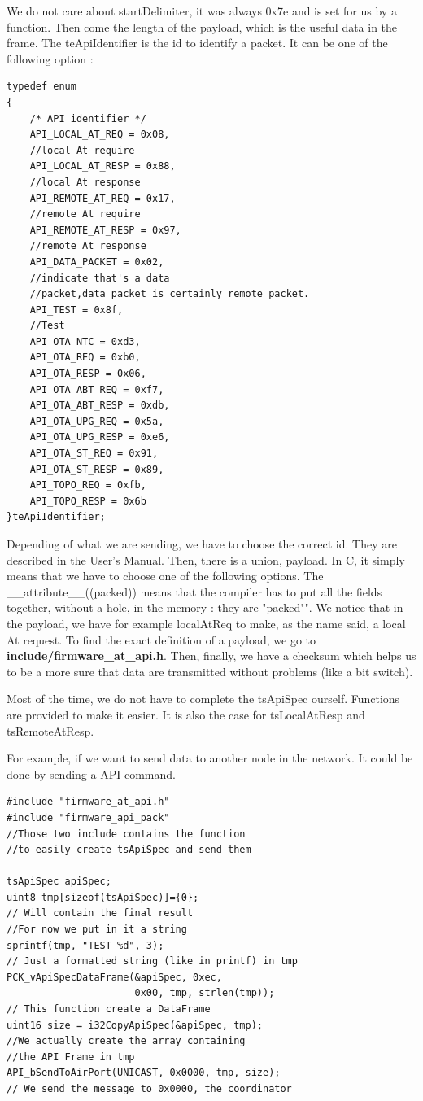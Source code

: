 We do not care about startDelimiter, it was always 0x7e and is set for us by a function. Then come the length of the payload, which is the useful data in the frame. The teApiIdentifier is the id to identify a packet. It can be one of the following option :

\begin{lstlisting}[frame=single]
typedef enum
{
    /* API identifier */
    API_LOCAL_AT_REQ = 0x08,      
    //local At require
    API_LOCAL_AT_RESP = 0x88,    
    //local At response
    API_REMOTE_AT_REQ = 0x17,    
    //remote At require
    API_REMOTE_AT_RESP = 0x97,   
    //remote At response
    API_DATA_PACKET = 0x02,      
    //indicate that's a data 
    //packet,data packet is certainly remote packet.
    API_TEST = 0x8f,             
    //Test
    API_OTA_NTC = 0xd3,
    API_OTA_REQ = 0xb0,
    API_OTA_RESP = 0x06,
    API_OTA_ABT_REQ = 0xf7,
    API_OTA_ABT_RESP = 0xdb,
    API_OTA_UPG_REQ = 0x5a,
    API_OTA_UPG_RESP = 0xe6,
    API_OTA_ST_REQ = 0x91,
    API_OTA_ST_RESP = 0x89,
    API_TOPO_REQ = 0xfb,
    API_TOPO_RESP = 0x6b
}teApiIdentifier;
\end{lstlisting}

Depending of what we are sending, we have to choose the correct id. They are described in the User's Manual. Then, there is a union, payload. In C, it simply means that we have to choose one of the following options. The \_\_attribute\_\_((packed)) means that the compiler has to put all the fields together, without a hole, in the memory : they are "packed"". We notice that in the payload, we have for example localAtReq to make, as the name said, a local At request. To find the exact definition of a payload, we go to \textbf{include/firmware\_at\_api.h}. Then, finally, we have a checksum which helps us to be a more sure that data are transmitted without problems (like a bit switch).

Most of the time, we do not have to complete the tsApiSpec ourself. Functions are provided to make it easier. It is also the case for tsLocalAtResp and tsRemoteAtResp.

For example, if we want to send data to another node in the network. It could be done by sending a API command.

\begin{lstlisting}[frame=single]
#include "firmware_at_api.h"
#include "firmware_api_pack"
//Those two include contains the function
//to easily create tsApiSpec and send them

tsApiSpec apiSpec;
uint8 tmp[sizeof(tsApiSpec)]={0}; 
// Will contain the final result
//For now we put in it a string
sprintf(tmp, "TEST %d", 3); 
// Just a formatted string (like in printf) in tmp
PCK_vApiSpecDataFrame(&apiSpec, 0xec,
                      0x00, tmp, strlen(tmp));
// This function create a DataFrame
uint16 size = i32CopyApiSpec(&apiSpec, tmp); 
//We actually create the array containing 
//the API Frame in tmp
API_bSendToAirPort(UNICAST, 0x0000, tmp, size);
// We send the message to 0x0000, the coordinator
\end{lstlisting}

